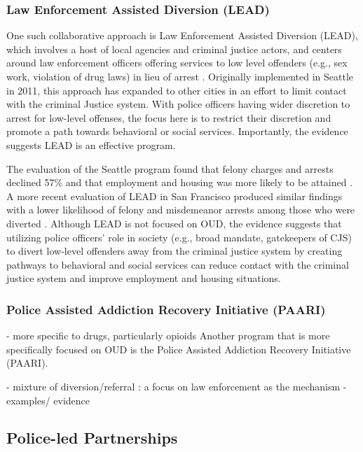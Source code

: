 \subsubsection{Law Enforcement Assisted Diversion (LEAD)}

One such collaborative approach is Law Enforcement Assisted Diversion (LEAD), which involves a host of local agencies and criminal justice actors, and centers around law enforcement officers offering services to low level offenders (e.g., sex work, violation of drug laws) in lieu of arrest \parencite{national_institute_of_justice_program_2016}. Originally implemented in Seattle in 2011, this approach has expanded to other cities in an effort to limit contact with the criminal Justice system. With police officers having wider discretion to arrest for low-level offenses, the focus here is to restrict their discretion and promote a path towards behavioral or social services. Importantly, the evidence suggests LEAD is an effective program.

The evaluation of the Seattle program found that felony charges and arrests declined 57\% \parencite{collins_seattles_2017} and that employment and housing was more likely to be attained \parencite{clifasefi_seattles_2017}. A more recent evaluation of LEAD in San Francisco produced similar findings with a lower likelihood of felony and misdemeanor arrests among those who were diverted \parencite{perrone_harm_2022}. Although LEAD is not focused on OUD, the evidence suggests that utilizing police officers' role in society (e.g., broad mandate, gatekeepers of CJS) to divert low-level offenders away from the criminal justice system by creating pathways to behavioral and social services can reduce contact with the criminal justice system and improve employment and housing situations.

\subsubsection{Police Assisted Addiction Recovery Initiative (PAARI)}

- more specific to drugs, particularly opioids
Another program that is more specifically focused on OUD is the Police Assisted Addiction Recovery Initiative (PAARI). 

- mixture of diversion/referral : a focus on law enforcement as the mechanism
- examples/ evidence

\subsection{Police-led Partnerships}

